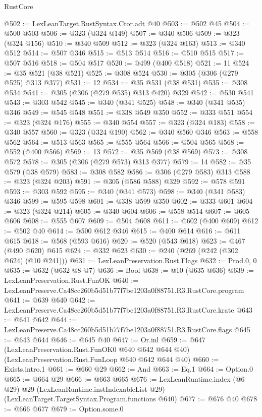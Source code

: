 \begin{lexlean}{RustCore}
\begin{coremodule}
@502 := LexLeanTarget.RustSyntax.Ctor.adt @40
@503 := @502 @45
@504 := @500 @503
@506 := @323 (@324 @149)
@507 := @340 @506
@509 := @323 (@324 @156)
@510 := @340 @509
@512 := @323 (@324 @163)
@513 := @340 @512
@514 := @507 @346
@515 := @513 @514
@516 := @510 @515
@517 := @507 @516
@518 := @504 @517
@520 := @499 (@400 @518)
@521 := 11
@524 := @35 @521 (@38 @521)
@525 := @308 @524
@530 := @305 (@306 (@279 @525) @313 @377)
@531 := 12
@534 := @35 @531 (@38 @531)
@535 := @308 @534
@541 := @305 (@306 (@279 @535) @313 @420) @329
@542 := @530 @541
@543 := @303 @542
@545 := @340 (@341 @525)
@548 := @340 (@341 @535) @346
@549 := @545 @548
@551 := @338 @549 @350
@552 := @333 @551
@554 := @323 (@324 @176)
@555 := @340 @554
@557 := @323 (@324 @183)
@558 := @340 @557
@560 := @323 (@324 @190)
@562 := @340 @560 @346
@563 := @558 @562
@564 := @513 @563
@565 := @555 @564
@566 := @504 @565
@568 := @552 (@400 @566)
@569 := 13
@572 := @35 @569 (@38 @569)
@573 := @308 @572
@578 := @305 (@306 (@279 @573) @313 @377)
@579 := 14
@582 := @35 @579 (@38 @579)
@583 := @308 @582
@586 := @306 (@279 @583) @313
@588 := @323 (@324 @203)
@591 := @305 (@586 @588) @329
@592 := @578 @591
@593 := @303 @592
@595 := @340 (@341 @573)
@598 := @340 (@341 @583) @346
@599 := @595 @598
@601 := @338 @599 @350
@602 := @333 @601
@604 := @323 (@324 @214)
@605 := @340 @604
@606 := @558 @514
@607 := @605 @606
@608 := @555 @607
@609 := @504 @608
@611 := @602 (@400 @609)
@612 := @502 @40
@614 := @500 @612 @346
@615 := @400 @614
@616 := @611 @615
@618 := @568 (@593 @616)
@620 := @520 (@543 @618)
@623 := @467 (@490 @620) @615
@624 := @332 @623
@630 := @240 (@269 (@242 (@302 @624) (@10 @241)))
@631 := LexLeanPreservation.Rust.Flags
@632 := Prod.{0, 0}
@635 := @632 (@632 @8 @7)
@636 := Bool
@638 := @10 (@635 @636)
@639 := LexLeanPreservation.Rust.FunOK
@640 := LexLeanPreserve.Ca48cc260b5d51b77f7be1203a0f88751.R3.RustCore.program
@641 := @639 @640
@642 := LexLeanPreserve.Ca48cc260b5d51b77f7be1203a0f88751.R3.RustCore.krate
@643 := @641 @642
@644 := LexLeanPreserve.Ca48cc260b5d51b77f7be1203a0f88751.R3.RustCore.flags
@645 := @643 @644
@646 := @645 @40
@647 := Or.inl
@659 := @647
    (LexLeanPreservation.Rust.FunOK0 @640 @642 @644 @40)
    (LexLeanPreservation.Rust.FunLoop @640 @642 @644 @40)
@660 := Exists.intro.{1}
@661 := @660 @29
@662 := And
@663 := Eq.{1}
@664 := Option.{0}
@665 := @664 @29
@666 := @663 @665
@676 := LexLeanRuntime.index
    (@6 @29)
    @29
    (LexLeanRuntime.instIndexableList @29)
    (LexLeanTarget.TargetSyntax.Program.functions @640)
@677 := @676 @40
@678 := @666 @677
@679 := Option.some.{0}

\end{coremodule}
\end{lexlean}
